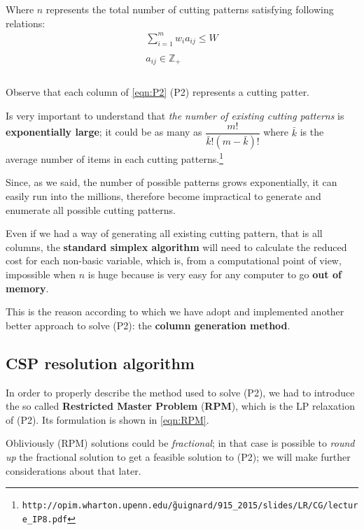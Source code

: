 \documentclass[10pt,a4paper]{article}
\begin{document}
Where $n$ represents the total number of cutting patterns satisfying following relations:
\begin{equation}
\begin{array} {c} 
\displaystyle\sum_{i=1}^m w_i a_{ij} \leq W \\\\ a_{ij} \in \mathbb{Z}_{+}\\\\
\end{array}
\end{equation}

Observe that each column of \ref{eqn:P2} (P2) represents a cutting patter. 

Is very important to understand that \textit{the number of existing cutting patterns} is \textbf{exponentially large}; it could be as many as $\dfrac{m!}{\bar{k}!(m-\bar{k})!}$ where $\bar{k}$ is the average number of items in each cutting patterns.\footnote{\texttt{http://opim.wharton.upenn.edu/\~guignard/915\_2015/slides/LR/CG/lecture\_IP8.pdf}}

Since, as we said, the number of possible patterns grows exponentially, it can easily run into the millions, therefore become impractical to generate and enumerate all possible cutting patterns. 

Even if we had a way of generating all existing cutting pattern, that is all columns, the \textbf{standard simplex algorithm} will need to calculate the reduced cost for each non-basic variable, which is, from a computational point of view, impossible when $n$ is huge because is very easy for any computer to go \textbf{out of memory}.

This is the reason according to which we have adopt and implemented another better approach to solve (P2): the \textbf{column generation method}.

\newpage
\subsection{CSP resolution algorithm}\label{cspresolalg}

In order to properly describe the method used to solve (P2), we had to introduce the so called \textbf{Restricted Master Problem} (\textbf{RPM}), which is the LP relaxation of (P2). Its formulation is shown in \ref{eqn:RPM}.

Obliviously (RPM) solutions could be \textit{fractional}; in that case is possible to \textit{round up} the fractional solution to get a feasible solution to (P2); we will make further considerations about that later. 
\end{document}
